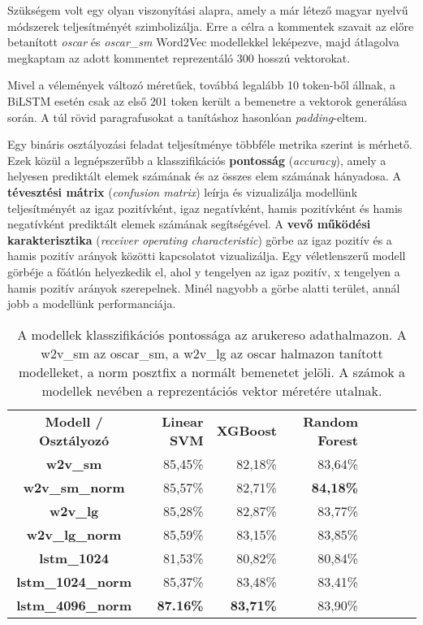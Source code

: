 Szükségem volt egy olyan viszonyítási alapra, amely a már létező magyar nyelvű módszerek teljesítményét szimbolizálja. Erre a célra a kommentek szavait az előre betanított \textit{oscar} és \textit{oscar\_sm} Word2Vec modellekkel leképezve, majd átlagolva megkaptam az adott kommentet reprezentáló 300 hosszú vektorokat.

Mivel a vélemények változó méretűek, továbbá legalább 10 token-ből állnak, a BiLSTM esetén csak az első 201 token került a bemenetre a vektorok generálása során. A túl rövid paragrafusokat a tanításhoz hasonlóan \textit{padding}-eltem.

Egy bináris osztályozási feladat teljesítménye többféle metrika szerint is mérhető. Ezek közül a legnépszerűbb a klasszifikációs \textbf{pontosság} (\textit{accuracy}), amely a helyesen prediktált elemek számának és az összes elem számának hányadosa. A \textbf{tévesztési mátrix} (\textit{confusion matrix}) leírja és vizualizálja modellünk teljesítményét az igaz pozitívként, igaz negatívként, hamis pozitívként és hamis negatívként prediktált elemek számának segítségével. A \textbf{vevő működési karakterisztika} (\textit{receiver operating characteristic}) görbe az igaz pozitív és a hamis pozitív arányok közötti kapcsolatot vizualizálja. Egy véletlenszerű modell görbéje a főátlón helyezkedik el, ahol y tengelyen az igaz pozitív, x tengelyen a hamis pozitív arányok szerepelnek. Minél nagyobb a görbe alatti terület, annál jobb a modellünk performanciája.

\begin{table}[H]
	\centering
	\begin{tabular}{ | c | r | r | r | r | r | r | r |}
		\hline
		\multirow{2}{*}{\textbf{Modell / Osztályozó}} & \multirow{2}{*}{\textbf{Linear SVM}} & \multirow{2}{*}{\textbf{XGBoost}} & \multirow{2}{*}{\textbf{Random Forest}} \\
		& & & \\
		\hline \hline		
		\textbf{w2v\_sm} & 85,45\% & 82,18\% & 83,64\% \\
		\hline
		\textbf{w2v\_sm\_norm} & 85,57\% & 82,71\% & \textbf{84,18\%} \\
		\hline
		\textbf{w2v\_lg} & 85,28\% & 82,87\% & 83,77\% \\
		\hline
		\textbf{w2v\_lg\_norm} & 85,59\% & 83,15\% & 83,85\% \\
		\hline  
		\textbf{lstm\_1024} & 81,53\% & 80,82\% & 80,84\% \\
		\hline  
		\textbf{lstm\_1024\_norm} & 85,37\% & 83,48\% & 83,41\% \\
		\hline
		\textbf{lstm\_4096\_norm} & \textbf{87.16\%} & \textbf{83,71\%} & 83,90\% \\
		\hline
	\end{tabular}
	\caption[A modellek pontossága]{A modellek klasszifikációs pontossága az arukereso adathalmazon. A w2v\_sm az oscar\_sm, a w2v\_lg az oscar halmazon tanított modelleket, a norm posztfix a normált bemenetet jelöli. A számok a modellek nevében a reprezentációs vektor méretére utalnak.}
	\label{tab:evaluation}
\end{table}

